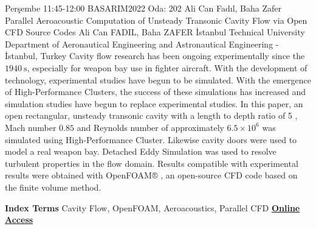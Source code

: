 
    \begin{abstract_basarim}
    {Perşembe 11:45-12:00}
    {BASARIM2022}
    {Oda: 202}
    {Ali Can Fadıl, Baha Zafer}
    {Parallel Aeroacoustic Computation of Unsteady Transonic Cavity Flow via Open CFD Source Codes}
    {%
    Ali Can FADIL, Baha ZAFER}
    {%
    }
    {%
    İstanbul Technical University Department of Aeronautical Engineering and Astronautical Engineering - İstanbul, Turkey}
    Cavity flow research has been ongoing experimentally since the $1940 \mathrm{~s}$, especially for weapon bay use in fighter aircraft. With the development of technology, experimental studies have begun to be simulated. With the emergence of High-Performance Clusters, the success of these simulations has increased and simulation studies have begun to replace experimental studies. In this paper, an open rectangular, unsteady transonic cavity with a length to depth ratio of 5 , Mach number $0.85$ and Reynolds number of approximately $6.5 \times 10^{6}$ was simulated using High-Performance Cluster. Likewise cavity doors were used to model a real weapon bay. Detached Eddy Simulation was used to resolve turbulent properties in the flow domain. Results compatible with experimental results were obtained with OpenFOAM® , an open-source CFD code based on the finite volume method. 
    
            \textbf{Index Terms} \newline{}Cavity Flow, OpenFOAM, Aeroacoustics, Parallel CFD
     \newline\newline\noindent \href{https://drive.google.com/file/d/1pKCyVXTdrWHUH7O6-6xgtM3TQe_HNbsf/view?usp=drivesdk}{\bfseries Online Access}
    \end{abstract_basarim}
    